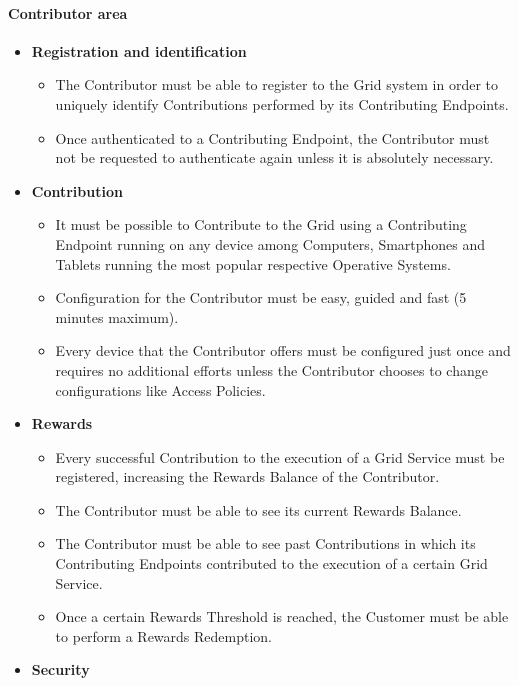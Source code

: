 \paragraph{Contributor area}
\begin{itemize}
    \item \textbf{Registration and identification}
    \begin{itemize}
        \item The Contributor must be able to register to the Grid system in order to uniquely identify Contributions performed by its Contributing Endpoints.
        \item Once authenticated to a Contributing Endpoint, the Contributor must not be requested to authenticate again unless it is absolutely necessary.
    \end{itemize}
    \vspace{5mm}
    \item \textbf{Contribution}
    \begin{itemize}
        \item It must be possible to Contribute to the Grid using a Contributing Endpoint running on any device among Computers, Smartphones and Tablets running the most popular respective Operative Systems.
        \item Configuration for the Contributor must be easy, guided and fast (5 minutes maximum).
        \item Every device that the Contributor offers must be configured just once and requires no additional efforts unless the Contributor chooses to change configurations like Access Policies.
    \end{itemize}
    \item \textbf{Rewards}
    \begin{itemize}
        \item Every successful Contribution to the execution of a Grid Service must be registered, increasing the Rewards Balance of the Contributor.
        \item The Contributor must be able to see its current Rewards Balance.
        \item The Contributor must be able to see past Contributions in which its Contributing Endpoints contributed to the execution of a certain Grid Service.
        \item Once a certain Rewards Threshold is reached, the Customer must be able to perform a Rewards Redemption.
    \end{itemize}
    \item \textbf{Security}

\end{itemize}
